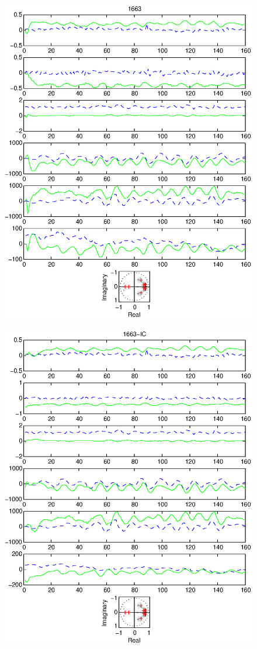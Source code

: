 \documentclass{article}
\begin{document}
\begin{figure}[htb!]
\centering
\includegraphics{1663.eps}
\end{figure}\clearpage
\begin{figure}[htb!]
\centering
\includegraphics{1663_ic.eps}
\end{figure}\clearpage
\end{document}
